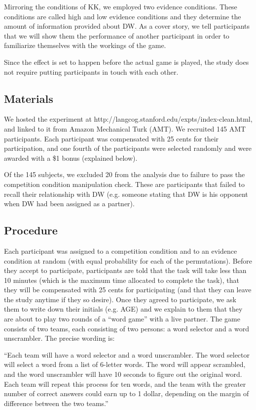 \documentclass{article}
\begin{document}
Mirroring the conditions of KK, we employed two evidence conditions. These conditions are called  high and low evidence conditions and they determine the amount of information provided about DW. As a cover story, we tell participants that we will show them the performance of another participant in order to familiarize themselves with the workings of the game.

Since the effect is set to happen before the actual game is played, the study does not require putting participants in touch with each other.

\subsection{Materials}

We hosted the experiment at http://langcog.stanford.edu/expts/index-clean.html, and linked to it from Amazon Mechanical Turk (AMT). We recruited 145 AMT participants. Each participant was compensated with 25 cents for their participation, and one fourth of the participants were selected randomly and were awarded with a \$1 bonus (explained below).

Of the 145 subjects, we excluded 20 from the analysis due to failure to pass the competition condition manipulation check. These are participants that failed to recall their relationship with DW (e.g. someone stating that DW is his opponent when DW had been assigned as a partner).


\subsection{Procedure}

Each participant was assigned to a competition condition and to an evidence condition at random (with equal probability for each of the permutations). Before they accept to participate, participants are told that the task will take less than 10 minutes (which is the maximum time allocated to complete the task), that they will be compensated with 25 cents for participating (and that they can leave the study anytime if they so desire). Once they agreed to participate, we ask them to write down their initials (e.g. AGE) and we explain to them that they are about to play two rounds of a ``word game'' with a live partner. The game consists of two teams, each consisting of two persons: a word selector and a word unscrambler. The precise wording is:

``Each team will have a word selector and a word unscrambler. The word selector will select a word from a list of 6-letter words. The word will appear scrambled, and the word unscrambler will have 10 seconds to figure out the original word. Each team will repeat this process for ten words, and the team with the greater number of correct answers could earn up to 1 dollar, depending on the margin of difference between the two teams.''
\end{document}
